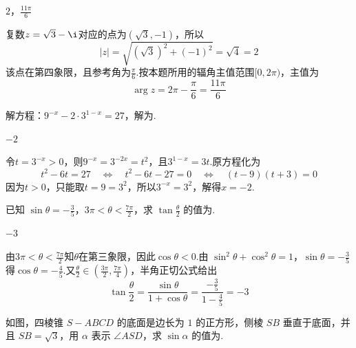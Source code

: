 \documentclass[UTF8,a4paper,oneside,11pt]{ctexbook}
\begin{document}
\begin{answer}
\(2\)，\(\frac{11\pi}{6}\)
\end{answer}

\begin{solution}
复数\(z=\sqrt{3}-\i\)对应的点为\((\sqrt{3},-1)\)，所以
\[
|z|=\sqrt{(\sqrt{3})^2+(-1)^2}=\sqrt4=2
\]
该点在第四象限，且参考角为\(\frac{\pi}{6}\).按本题所用的辐角主值范围\([0,2\pi)\)，主值为
\[
\arg z=2\pi-\frac{\pi}{6}=\frac{11\pi}{6}
\]
\end{solution}

\begin{problem}

解方程：\(9^{-x} - 2 \cdot 3^{1 - x} = 27\)，解为\fillinblank{}.
\end{problem}

\begin{answer}
\(-2\)
\end{answer}

\begin{solution}
令\(t=3^{-x}>0\)，则\(9^{-x}=3^{-2x}=t^2\)，且\(3^{1-x}=3t\).原方程化为
\[
t^2-6t=27
\quad\Longleftrightarrow\quad
t^2-6t-27=0
\quad\Longleftrightarrow\quad
(t-9)(t+3)=0
\]
因为\(t>0\)，只能取\(t=9=3^2\)，所以\(3^{-x}=3^2\)，解得\(x=-2\).
\end{solution}

\begin{problem}

已知 \(\sin \theta = -\frac{3}{5}\)，\(3\pi < \theta < \frac{7\pi}{2}\)，求 \(\tan \frac{\theta}{2}\) 的值为\fillinblank{}.
\end{problem}

\begin{answer}
\(-3\)
\end{answer}

\begin{solution}
由\(3\pi<\theta<\frac{7\pi}{2}\)知\(\theta\)在第三象限，因此\(\cos\theta<0\).由
\(\sin^2\theta+\cos^2\theta=1\)，\(\sin\theta=-\frac35\)
得\(\cos\theta=-\frac45\).又\(\frac{\theta}{2}\in(\frac{3\pi}{2},\frac{7\pi}{4})\)，半角正切公式给出
\[
\tan\frac{\theta}{2}=\frac{\sin\theta}{1+\cos\theta}
=\frac{-\frac35}{1-\frac45}=-3
\]
\end{solution}

\begin{problem}

如图，四棱锥 \(S-ABCD\) 的底面是边长为 \(1\) 的正方形，侧棱 \(SB\) 垂直于底面，并且 \(SB=\sqrt{3}\)，用 \(\alpha\) 表示 \(\angle ASD\)，求 \(\sin \alpha\) 的值为\fillinblank{}.

\end{problem}
\end{document}

